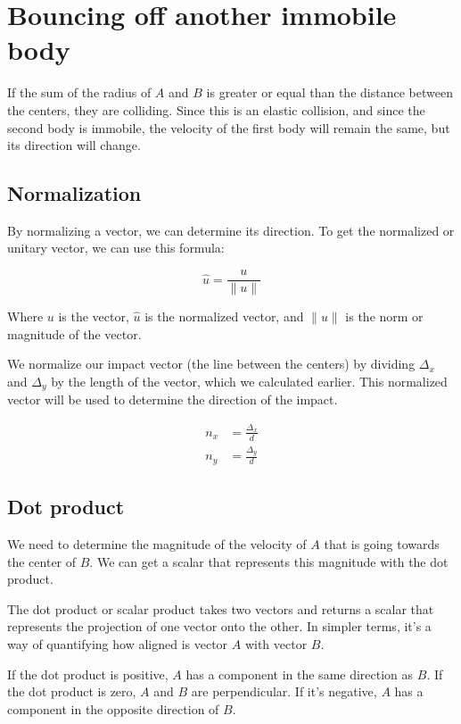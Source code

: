 \documentclass{amsart}
\begin{document}
\section{Bouncing off another immobile body}

If the sum of the radius of $A$ and $B$ is greater or equal than the distance
between the centers, they are colliding. Since this is an elastic collision, and
since the second body is immobile, the velocity of the first body will remain
the same, but its direction will change.

\subsection{Normalization}

By normalizing a vector, we can determine its direction. To get the normalized
or unitary vector, we can use this formula:

\begin{displaymath}
  \hat{u} = \frac{u}{\|u\|}
\end{displaymath}

Where $u$ is the vector, $\hat{u}$ is the normalized vector, and $\|u\|$ is the
norm or magnitude of the vector.

We normalize our impact vector (the line between the centers) by dividing
$\Delta_x$ and $\Delta_y$ by the length of the vector, which we calculated
earlier. This normalized vector will be used to determine the direction of the
impact.

\begin{align*}
  n_x &= \frac{\Delta_x}{d} \\
  n_y &= \frac{\Delta_y}{d}
\end{align*}

\subsection{Dot product}

We need to determine the magnitude of the velocity of $A$ that is going towards
the center of $B$. We can get a scalar that represents this magnitude with the
dot product.

The dot product or scalar product takes two vectors and returns a scalar that
represents the projection of one vector onto the other. In simpler terms, it's a
way of quantifying how aligned is vector $A$ with vector $B$.

If the dot product is positive, $A$ has a component in the same direction as
$B$. If the dot product is zero, $A$ and $B$ are perpendicular. If it's
negative, $A$ has a component in the opposite direction of $B$.
\end{document}
